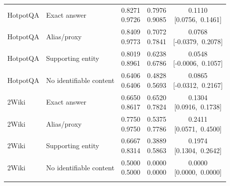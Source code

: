 \begin{table}[htbp]
\begin{tabularx}{\textwidth}{@{}l>{\raggedright\arraybackslash}Xccc@{}}
\midrule
HotpotQA & Exact answer & \shortstack{0.8271\\0.9726} & \shortstack{0.7976\\0.9085} & \shortstack{0.1110\\\mbox{[0.0756, 0.1461]}} \\
\addlinespace[\jot]
HotpotQA & Alias/proxy & \shortstack{0.8409\\0.9773} & \shortstack{0.7072\\0.7841} & \shortstack{0.0768\\\mbox{[-0.0379, 0.2078]}} \\
\addlinespace[\jot]
HotpotQA & Supporting entity & \shortstack{0.8019\\0.8961} & \shortstack{0.6238\\0.6786} & \shortstack{0.0548\\\mbox{[-0.0006, 0.1057]}} \\
\addlinespace[\jot]
HotpotQA & No identifiable content & \shortstack{0.6406\\0.6406} & \shortstack{0.4828\\0.5693} & \shortstack{0.0865\\\mbox{[-0.0312, 0.2167]}} \\
\addlinespace[\jot]
2Wiki & Exact answer & \shortstack{0.6650\\0.8617} & \shortstack{0.6520\\0.7824} & \shortstack{0.1304\\\mbox{[0.0916, 0.1738]}} \\
\addlinespace[\jot]
2Wiki & Alias/proxy & \shortstack{0.7750\\0.9750} & \shortstack{0.5375\\0.7786} & \shortstack{0.2411\\\mbox{[0.0571, 0.4500]}} \\
\addlinespace[\jot]
2Wiki & Supporting entity & \shortstack{0.6667\\0.8314} & \shortstack{0.3889\\0.5863} & \shortstack{0.1974\\\mbox{[0.1304, 0.2642]}} \\
\addlinespace[\jot]
2Wiki & No identifiable content & \shortstack{0.5000\\0.5000} & \shortstack{0.0000\\0.0000} & \shortstack{0.0000\\\mbox{[0.0000, 0.0000]}} \\
\addlinespace[\jot]
\bottomrule
\end{tabularx}

\end{table}
